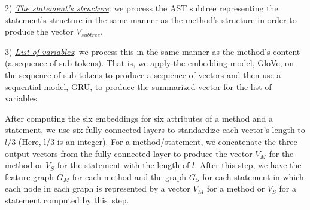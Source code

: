


2) {\em \underline{The statement's structure}}: we process the AST
subtree representing the statement's structure in the same manner as
the method's structure in order to produce the vector $V_{subtree}$.



3) {\em \underline{List of variables}}: we process this in the same
manner as the method's content (a sequence of sub-tokens). That is, we
apply the embedding model, GloVe, on the sequence of sub-tokens to
produce a sequence of vectors and then use a sequential model, GRU, to
produce the summarized vector for the list of variables.


After computing the six embeddings for six attributes of a method and
a statement, we use six fully connected layers to standardize each
vector's length to $l/3$ (Here, l/3 is an integer). For a
method/statement, we concatenate the three output vectors from the
fully connected layer to produce the vector $V_{M}$ for the method or
$V_{S}$ for the statement with the length of $l$. After this 
step, we have the feature graph $G_{M}$ for each method and the graph
$G_{S}$ for each statement in which each node in each graph is
represented by a vector $V_{M}$ for a method or $V_{S}$ for a
statement computed by this~step.

